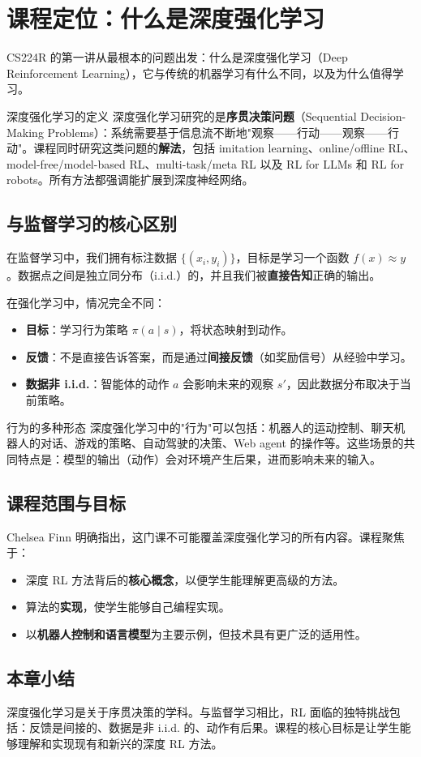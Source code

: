 \section{课程定位：什么是深度强化学习}

CS224R 的第一讲从最根本的问题出发：什么是深度强化学习（Deep Reinforcement Learning），它与传统的机器学习有什么不同，以及为什么值得学习。

\begin{importantbox}{深度强化学习的定义}
深度强化学习研究的是\textbf{序贯决策问题}（Sequential Decision-Making Problems）：系统需要基于信息流不断地"观察——行动——观察——行动"。课程同时研究这类问题的\textbf{解法}，包括 imitation learning、online/offline RL、model-free/model-based RL、multi-task/meta RL 以及 RL for LLMs 和 RL for robots。所有方法都强调能扩展到深度神经网络。
\end{importantbox}

\subsection{与监督学习的核心区别}

在监督学习中，我们拥有标注数据 $\{(x_i, y_i)\}$，目标是学习一个函数 $f(x) \approx y$。数据点之间是独立同分布（i.i.d.）的，并且我们被\textbf{直接告知}正确的输出。

在强化学习中，情况完全不同：

\begin{itemize}
    \item \textbf{目标}：学习行为策略 $\pi(a \mid s)$，将状态映射到动作。
    \item \textbf{反馈}：不是直接告诉答案，而是通过\textbf{间接反馈}（如奖励信号）从经验中学习。
    \item \textbf{数据非 i.i.d.}：智能体的动作 $a$ 会影响未来的观察 $s'$，因此数据分布取决于当前策略。
\end{itemize}

\begin{knowledgebox}{行为的多种形态}
深度强化学习中的"行为"可以包括：机器人的运动控制、聊天机器人的对话、游戏的策略、自动驾驶的决策、Web agent 的操作等。这些场景的共同特点是：模型的输出（动作）会对环境产生后果，进而影响未来的输入。
\end{knowledgebox}

\subsection{课程范围与目标}

Chelsea Finn 明确指出，这门课不可能覆盖深度强化学习的所有内容。课程聚焦于：
\begin{itemize}
    \item 深度 RL 方法背后的\textbf{核心概念}，以便学生能理解更高级的方法。
    \item 算法的\textbf{实现}，使学生能够自己编程实现。
    \item 以\textbf{机器人控制和语言模型}为主要示例，但技术具有更广泛的适用性。
\end{itemize}

\subsection{本章小结}

深度强化学习是关于序贯决策的学科。与监督学习相比，RL 面临的独特挑战包括：反馈是间接的、数据是非 i.i.d. 的、动作有后果。课程的核心目标是让学生能够理解和实现现有和新兴的深度 RL 方法。

